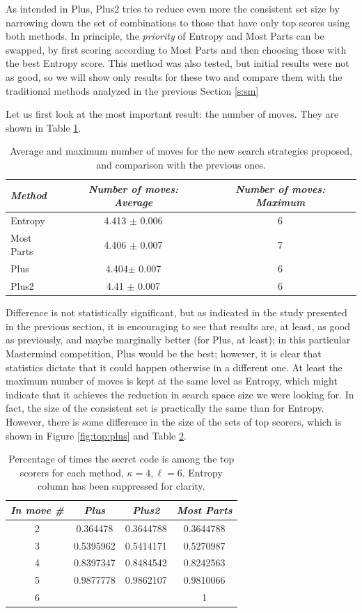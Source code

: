 \documentclass[preprint,12pt]{elsarticle}
\begin{document}
As intended in Plus, Plus2 tries to reduce even more the consistent set size by
narrowing down the set of combinations to those that have only top
scores using both methods. In principle, the {\em priority} of Entropy and Most
Parts can be swapped, by first scoring according to Most Parts and
then choosing those with the best Entropy score. This method was also
tested, but initial results were not as good, so we will show only
results for these two and compare them with the traditional methods
analyzed in the previous Section \ref{s:sm}

Let us first look at the most important result: the number of
moves. They are shown in Table \ref{tab:plus:46}.
\begin{table}[htb]
\caption{Average and maximum number of moves for the new search
  strategies proposed, and comparison with the previous ones. \label{tab:plus:46}}
  \centering
\smallskip
\begin{tabular}{|l|c|c|}
\hline
\emph{Method} & \emph{Number of moves: Average} & \emph{Number of
  moves: Maximum} \\
\hline
Entropy & 4.413 $\pm$ 0.006 & 6 \\
Most Parts & 4.406 $\pm$ 0.007 & 7 \\
Plus & 4.404$\pm$ 0.007 & 6 \\
Plus2 & 4.41 $\pm$ 0.007 & 6 \\
\hline
\end{tabular}
\end{table}
%
Difference is not statistically significant, but as indicated in the
study presented in the previous section, it is encouraging to see that
results are, at least, as good as previously, and maybe marginally
better (for Plus, at least); in this particular Mastermind
competition, Plus would be the best; however, it is clear that
statistics dictate that it could happen otherwise in a different
one. At least the maximum number of moves is kept at the same level 
as Entropy, which might indicate that it achieves the reduction in
search space size we were looking for. In fact, the size of the
consistent set is practically the same than for Entropy. However,
there is some difference in the size of the sets of top scorers, which
is shown in Figure \ref{fig:top:plus} and Table \ref{tab:top:plus}.
%
\begin{table}
\centering
\caption{Percentage of times the secret code is among the top scorers for
  each method, $\kappa=4, \ell=6$. Entropy column has been suppressed
  for clarity. \label{tab:top:plus}}
\smallskip
\begin{tabular}{|c|c|c|c|}
\hline
\emph{In move \#} & \emph{Plus} &\emph{Plus2} & \emph{Most Parts} \\
\hline
2 &  0.364478 & 0.3644788 & 0.3644788\\
3 & 0.5395962&  0.5414171 & 0.5270987 \\
4 & 0.8397347& 0.8484542 & 0.8242563 \\ 
5 & 0.9877778 & 0.9862107 &  0.9810066\\
6 & & & 1 \\
\hline
\end{tabular}
\end{table}
\end{document}
